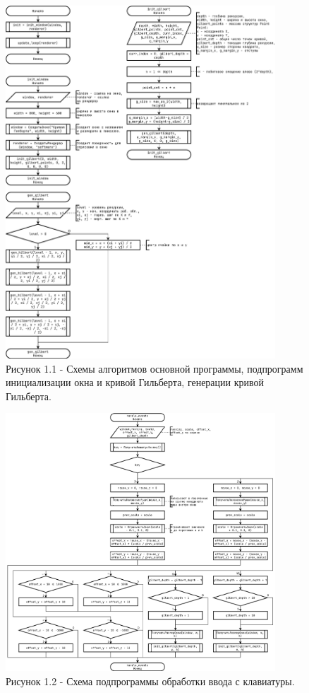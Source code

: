\documentclass[oneside,a4paper,14pt]{extarticle}
\begin{document}
\clearpage
\begin{figure}[H]
	\centering
	\includegraphics[width=0.9\textwidth]{pics/flowchart1.png}
	\caption*{Рисунок 1.1 - Схемы алгоритмов основной программы, подпрограмм инициализации окна и кривой Гильберта, генерации кривой Гильберта.}
\end{figure}

\clearpage
\begin{figure}[H]
	\centering
	\includegraphics[width=0.9\textwidth]{pics/flowchart2.png}
	\caption*{Рисунок 1.2 - Схема подпрограммы обработки ввода с клавиатуры.}
\end{figure}
\end{document}
